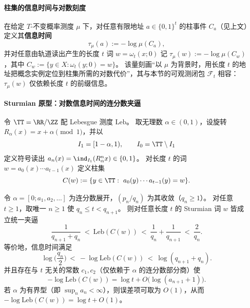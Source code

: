 \paragraph{柱集的信息时间与对数刻度}\label{par:spg-cylinder-information-time}
在给定 \(T\)-不变概率测度 \(\mu\) 下，对任意有限地址 \(a\in\{0,1\}^t\) 的柱事件 \(C_a\)（见上文）定义其\textbf{信息时间}
\[
\tau_\mu(a):=-\log\mu(C_a),
\]
并对任意由轨道读出产生的长度 \(t\) 词 \(w=\omega_t(x;0)\) 记
\(
\tau_\mu(w):=-\log\mu(C_w)
\)，其中 \(C_w:=\{y\in X:\omega_t(y;0)=w\}\)。
该量刻画“以 \(\mu\) 为背景时，用长度 \(t\) 的地址把概念实例定位到柱集所需的对数代价”，其与本节的可观测闭包 \(\mathcal F_t\) 相容：\(\tau_\mu(w)\) 仅依赖长度 \(t\) 的前缀信息。

\paragraph{Sturmian 原型：对数信息时间的连分数夹逼}\label{par:spg-sturmian-log-information-time}
令 \(\TT=\RR/\ZZ\) 配 Lebesgue 测度 \(\mathrm{Leb}\)。
取无理数 \(\alpha\in(0,1)\)，设旋转 \(R_\alpha(x)=x+\alpha\pmod 1\)，并以
\[
I_1=[1-\alpha,1),\qquad I_0=\TT\setminus I_1
\]
定义符号读出 \(a_n(x)=\ind_{I_1}(R_\alpha^n x)\in\{0,1\}\)。
对长度 \(t\) 的词 \(w=a_0(x)\cdots a_{t-1}(x)\) 定义柱集
\[
C(w):=\{y\in\TT:\ a_0(y)\cdots a_{t-1}(y)=w\}.
\]
\begin{theorem}\label{thm:spg-sturmian-cylinder-measure-continued-fraction-sandwich}
令 \(\alpha=[0;a_1,a_2,\dots]\) 为连分数展开，\((p_n/q_n)\) 为其收敛（\(q_n\ge 1\)）。
对任意 \(t\ge 1\)，取唯一 \(n\ge 1\) 使 \(q_n\le t<q_{n+1}\)。
则对任意长度 \(t\) 的 Sturmian 词 \(w\) 皆成立统一夹逼
\[
\frac{1}{q_{n+1}+q_n}\ <\ \mathrm{Leb}(C(w))\ <\ \frac{1}{q_n}+\frac{1}{q_{n+1}}\ <\ \frac{2}{q_n}.
\]
等价地，信息时间满足
\[
\log\!\Big(\frac{q_n}{2}\Big)\ <\ -\log \mathrm{Leb}(C(w))\ <\ \log(q_{n+1}+q_n).
\]
并且存在与 \(t\) 无关的常数 \(c_1,c_2\)（仅依赖于 \(\alpha\) 的连分数部分商）使
\[
-\log \mathrm{Leb}(C(w))=\log t+O\!\bigl(\log(a_{n+1}+1)\bigr).
\]
若 \(\alpha\) 为有界型（即 \(\sup_n a_n<\infty\)），则误差项可取为 \(O(1)\)，从而 \(-\log \mathrm{Leb}(C(w))=\log t+O(1)\)。
\end{theorem}
